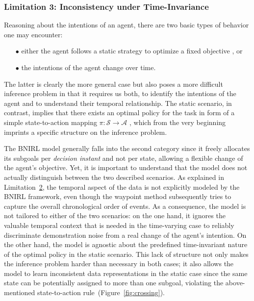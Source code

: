 \documentclass[twoside,11pt]{article}
\begin{document}
\subsubsection*{Limitation 3: Inconsistency under Time-Invariance}
\label{phantom:lim3}
Reasoning about the intentions of an %
agent, there are two basic types of behavior one may encounter:
\begin{enumerate}[topsep=-\parskip+1.5ex, itemsep=1ex, parsep=0mm]
\item[$\bullet$] either the agent follows a static strategy %
to optimize a fixed objective \citep[as assumed in the standard MDP formalism,][]{sutton1998reinforcement}, or
\item[$\bullet$] the intentions of the agent change over time.
\end{enumerate}
The latter is clearly the more general case but also poses a more difficult inference problem in that it requires us both, to identify the %
intentions of the agent and to understand their temporal relationship. The static scenario, in contrast, implies that there exists an optimal policy for the task %
in %
form of a simple state-to-action mapping $\pi:\mathcal{S}\rightarrow\mathcal{A}$ \citep{puterman1994}, which from the very beginning %
%
imprints a specific structure on the inference problem.

The BNIRL model generally falls into the second category since it freely allocates its subgoals per \textit{decision instant} and not per state, allowing a flexible change of the agent's objective. Yet, it is important to understand that 
the model does not actually distinguish  %
 between the two described scenarios. %
As explained in Limitation~\hyperref[phantom:lim2]{2}, the temporal aspect of the data is not explicitly modeled by the BNIRL framework, even though the waypoint method %
%
subsequently tries to capture the overall %
chronological %
order of  events.
%
As a consequence, the model is not tailored to either of the two scenarios: on the one hand, it ignores the valuable temporal context %
that is needed  in the time-varying case to  %
reliably discriminate demonstration noise from a real change of the agent's intention. %
On the other hand, the model is agnostic about the predefined time-invariant nature of the optimal policy in the static scenario. This lack of structure not only makes the inference problem harder than necessary in both cases; it also allows the model to learn inconsistent data representations in the static case %
since the same state can be potentially assigned to more than one subgoal, violating the above-mentioned %
state-to-action rule~(Figure~\ref{fig:crossing}).
\end{document}
